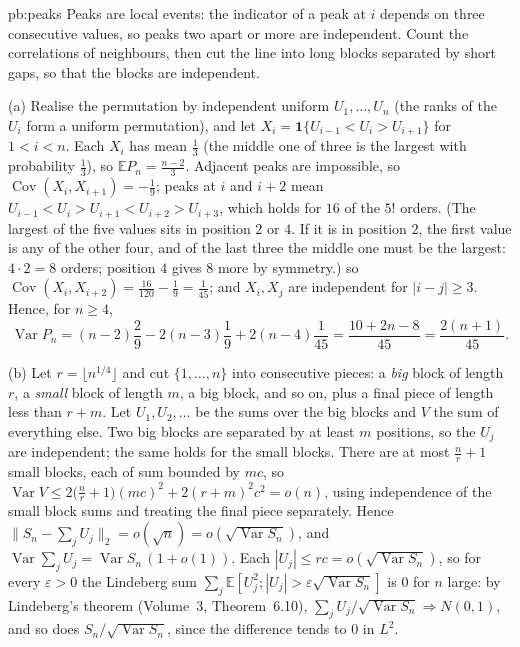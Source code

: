 \begin{solution}{pb:peaks}
\idea Peaks are local events: the indicator of a peak at $i$ depends on three consecutive values, so peaks two apart or more are independent. Count the
correlations of neighbours, then cut the line into long blocks separated by short gaps, so that the blocks are independent.

\writeup (a) Realise the permutation by independent uniform $U_1,\dots,U_n$ (the ranks of the $U_i$ form a uniform permutation), and let $X_i=\mathbf 1\{U_{i-1}<U_i>U_{i+1}\}$
for $1<i<n$. Each $X_i$ has mean $\frac13$ (the middle one of three is the largest with probability $\frac13$), so $\mathbb EP_n=\frac{n-2}3$. Adjacent peaks are
impossible, so $\operatorname{Cov}(X_i,X_{i+1})=-\frac19$; peaks at $i$ and $i+2$ mean $U_{i-1}<U_i>U_{i+1}<U_{i+2}>U_{i+3}$, which holds for $16$ of the $5!$ orders. (The largest of the five values sits in position $2$ or $4$. If it is in position $2$, the first value is any of
the other four, and of the last three the middle one must be the largest: $4\cdot2=8$ orders; position $4$ gives $8$ more by symmetry.) so $\operatorname{Cov}(X_i,X_{i+2})=\frac{16}{120}-\frac19=\frac1{45}$; and $X_i,X_j$ are independent for $|i-j|\ge3$. Hence, for $n\ge4$,
\[
\operatorname{Var}P_n=(n-2)\frac29-2(n-3)\frac19+2(n-4)\frac1{45}=\frac{10+2n-8}{45}=\frac{2(n+1)}{45}.
\]

(b) Let $r=\lfloor n^{1/4}\rfloor$ and cut $\{1,\dots,n\}$ into consecutive pieces: a \emph{big} block of length $r$, a \emph{small} block of length $m$, a big block, and so
on, plus a final piece of length less than $r+m$. Let $U_1,U_2,\dots$ be the sums over the big blocks and $V$ the sum of everything else. Two big blocks are separated by
at least $m$ positions, so the $U_j$ are independent; the same holds for the small blocks. There are at most $\frac n r+1$ small blocks, each of sum bounded by $mc$,
so $\operatorname{Var}V\le2\bigl(\frac nr+1\bigr)(mc)^2+2(r+m)^2c^2=o(n)$, using independence of the small block sums and treating the final piece separately. Hence
$\|S_n-\sum_jU_j\|_2=o(\sqrt n)=o(\sqrt{\operatorname{Var}S_n})$, and $\operatorname{Var}\sum_jU_j=\operatorname{Var}S_n\,(1+o(1))$. Each $|U_j|\le rc=o(\sqrt{\operatorname{Var}S_n})$,
so for every $\varepsilon>0$ the Lindeberg sum $\sum_j\mathbb E[U_j^2;|U_j|>\varepsilon\sqrt{\operatorname{Var}S_n}]$ is $0$ for $n$ large: by Lindeberg's theorem (Volume~3,
Theorem~6.10), $\sum_jU_j/\sqrt{\operatorname{Var}S_n}\Rightarrow N(0,1)$, and so does $S_n/\sqrt{\operatorname{Var}S_n}$, since the difference tends to $0$ in $L^2$.


\end{solution}
